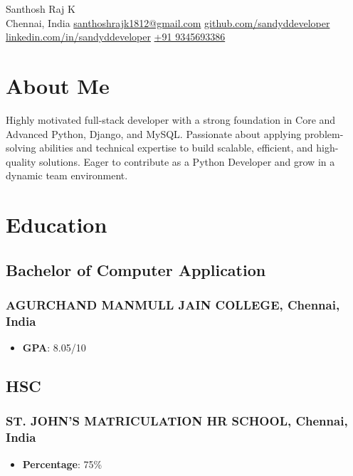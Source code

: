 \documentclass[11pt]{article}
\begin{document}
\begin{center}      
    {\fontsize{24}{24}\selectfont Santhosh Raj K} \\[10pt] %

    {\color{icnclr}\faMapMarker} Chennai, India \quad 
    {\color{icnclr}\faEnvelope[regular]} \href{mailto:santhoshrajk1812@gmail.com}{santhoshrajk1812@gmail.com} \quad
    {\color{icnclr}\faGithub[regular]} \href{https://github.com/sandyddeveloper}{github.com/sandyddeveloper} \quad \\[10pt]
    {\color{icnclr}\faLinkedin[regular]} \href{https://linkedin.com/in/sandyddeveloper}{linkedin.com/in/sandyddeveloper} \quad
    {\color{icnclr}\Mobilefone} \href{tel:+91 9345693386}{+91 9345693386}
\end{center}

\section{About Me}
Highly motivated full-stack developer with a strong foundation in Core and Advanced Python, Django, and MySQL.
Passionate about applying problem-solving abilities and technical expertise to build scalable, efficient, and high-quality solutions.
Eager to contribute as a Python Developer and grow in a dynamic team environment.
\section{Education}
\subsection{Bachelor of Computer Application \hfill {}}  
\subsubsection{AGURCHAND MANMULL JAIN COLLEGE, Chennai, India}
\begin{itemize}
    \item \textbf{GPA}: 8.05/10
\end{itemize}

\subsection{HSC \hfill {}}  
\subsubsection{ST. JOHN'S MATRICULATION HR SCHOOL, Chennai, India}
\begin{itemize}
    \item \textbf{Percentage}: 75\%
\end{itemize}
\end{document}

